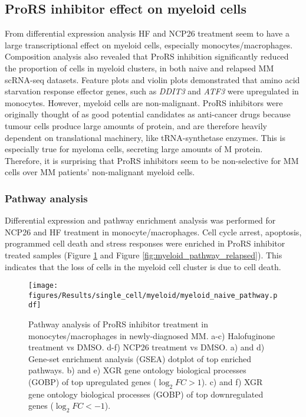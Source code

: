\subsection{ProRS inhibitor effect on myeloid cells}
From differential expression analysis HF and NCP26 treatment seem to have a large transcriptional effect on myeloid cells, especially monocytes/macrophages.
Composition analysis also revealed that ProRS inhibition significantly reduced the proportion of cells in myeloid clusters, in both naive and relapsed MM scRNA-seq datasets.
Feature plots and violin plots demonstrated that amino acid starvation response effector genes, such as \textit{DDIT3} and \textit{ATF3} were upregulated in monocytes.
However, myeloid cells are non-malignant.
ProRS inhibitors were originally thought of as good potential candidates as anti-cancer drugs because tumour cells produce large amounts of protein, and are therefore heavily dependent on translational machinery, like tRNA-synthetase enzymes.
This is especially true for myeloma cells, secreting large amounts of M protein.
Therefore, it is surprising that ProRS inhibitors seem to be non-selective for MM cells over MM patients' non-malignant myeloid cells.


\subsubsection{Pathway analysis}
Differential expression and pathway enrichment analysis was performed for NCP26 and HF treatment in monocyte/macrophages.
Cell cycle arrest, apoptosis, programmed cell death and stress responses were enriched in ProRS inhibitor treated samples (Figure \ref{fig:myeloid_pathway_naive} and Figure \ref{fig:myeloid_pathway_relapsed}).
This indicates that the loss of cells in the myeloid cell cluster is due to cell death.
\begin{figure}[htb]
\centering
\texttt{[image: figures/Results/single\_cell/myeloid/myeloid\_naive\_pathway.pdf]}
\caption[scRNA-seq myeloid cell pathway analysis- newly diagnosed MM]{Pathway analysis of ProRS inhibitor treatment in monocytes/macrophages in newly-diagnosed MM.
a-c) Halofuginone treatment vs DMSO.
d-f) NCP26 treatment vs DMSO.
a) and d) Gene-set enrichment analysis (GSEA) dotplot of top enriched pathways.
b) and e) XGR gene ontology biological processes (GOBP) of top upregulated genes ($\log_{2}FC >1$).
c) and f) XGR gene ontology biological processes (GOBP) of top downregulated genes ($\log_{2}FC < -1$).
}
\label{fig:myeloid_pathway_naive}
\end{figure}

